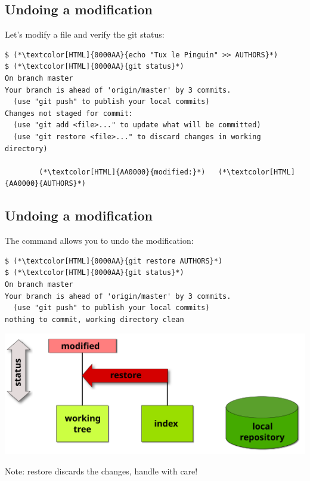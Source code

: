 \subsection{Undoing a modification}
\begin{frame}[fragile]
\subslidetitle

  Let's modify a file and verify the git status:
  \begin{lstlisting}
$ (*\textcolor[HTML]{0000AA}{echo "Tux le Pinguin" >> AUTHORS}*)
$ (*\textcolor[HTML]{0000AA}{git status}*)
On branch master
Your branch is ahead of 'origin/master' by 3 commits.
  (use "git push" to publish your local commits)
Changes not staged for commit:
  (use "git add <file>..." to update what will be committed)
  (use "git restore <file>..." to discard changes in working directory)

        (*\textcolor[HTML]{AA0000}{modified:}*)   (*\textcolor[HTML]{AA0000}{AUTHORS}*)

\end{lstlisting}

\end{frame}

\subsection{Undoing a modification}
\begin{frame}[fragile]
\subslidetitle
  The command  allows you to undo the modification:
  \begin{lstlisting}
$ (*\textcolor[HTML]{0000AA}{git restore AUTHORS}*)
$ (*\textcolor[HTML]{0000AA}{git status}*)
On branch master
Your branch is ahead of 'origin/master' by 3 commits.
  (use "git push" to publish your local commits)
nothing to commit, working directory clean
\end{lstlisting}

  \vspace{1em}
  \centerline{\includegraphics{assets/diagrams/undo-modified}}

  \vspace{1em}
  Note: restore discards the changes, handle with care!
\end{frame}

